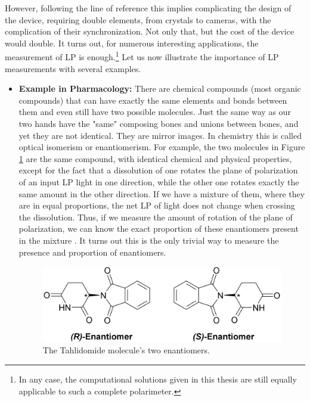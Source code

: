 \documentclass[11pt, a4paper, twoside]{article} %
\begin{document}
However, following the line of reference \cite{incomplete} this implies complicating the design of the device, requiring double elements, from crystals to cameras, with the complication of their synchronization. Not only that, but the cost of the device would double. It turns out, for numerous interesting applications, the measurement of LP is enough.\footnote{In any case, the computational solutions given in this thesis are still equally applicable to such a complete polarimeter.} Let us now illustrate the importance of LP measurements with several examples. \vspace{-0.3cm}
\begin{itemize}

\item{\bf Example in Pharmacology: }There are chemical compounds (most organic compounds) that can have exactly the same elements and bonds between them and even still have two possible molecules. Just the same way as our two hands have the "same" composing bones and unions between bones, and yet they are not identical. They are mirror images. In chemistry this is called optical isomerism or enantiomerism. For example, the two molecules in Figure \ref{fig:thalidomide} are the same compound, with identical chemical and physical properties, except for the fact that a dissolution of one rotates the plane of polarization of an input LP light in one direction, while the other one rotates exactly the same amount in the other direction. If we have a mixture of them, where they are in equal proportions, the net LP of light does not change when crossing the dissolution. Thus, if we measure the amount of rotation of the plane of polarization, we can know the exact proportion of these enantiomers present in the mixture \cite{enantiomers}. It turns out this is the only trivial way to measure the presence and proportion of enantiomers. 
\vspace{-0.1cm}
\begin{figure}[h!] 
     \centering 
    \includegraphics[width=0.5\linewidth]{thalidomide.png}
    \caption{The Tahlidomide molecule's two enantiomers.}
    \label{fig:thalidomide}
\end{figure}


\end{itemize}
\end{document}
